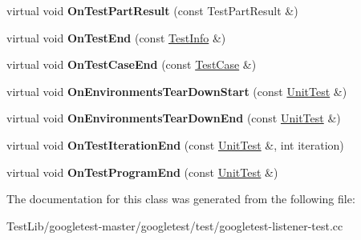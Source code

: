 \begin{DoxyCompactItemize}
virtual void {\bfseries On\+Test\+Part\+Result} (const Test\+Part\+Result \&)
\item 
\mbox{\label{classtesting_1_1internal_1_1EventRecordingListener_adb076f145cc20d9b27441b9c75da4b81}} 
virtual void {\bfseries On\+Test\+End} (const \hyperlink{classtesting_1_1TestInfo}{Test\+Info} \&)
\item 
\mbox{\label{classtesting_1_1internal_1_1EventRecordingListener_a4d0cb8a389c7339bce0aa6128291529f}} 
virtual void {\bfseries On\+Test\+Case\+End} (const \hyperlink{classtesting_1_1TestCase}{Test\+Case} \&)
\item 
\mbox{\label{classtesting_1_1internal_1_1EventRecordingListener_a17eebd7bb5cc6bab53b20794919ca5ae}} 
virtual void {\bfseries On\+Environments\+Tear\+Down\+Start} (const \hyperlink{classtesting_1_1UnitTest}{Unit\+Test} \&)
\item 
\mbox{\label{classtesting_1_1internal_1_1EventRecordingListener_acd5a3dc070265166a7da68222031fd61}} 
virtual void {\bfseries On\+Environments\+Tear\+Down\+End} (const \hyperlink{classtesting_1_1UnitTest}{Unit\+Test} \&)
\item 
\mbox{\label{classtesting_1_1internal_1_1EventRecordingListener_ab0cc007bcfaf06cd383d574c88f62aea}} 
virtual void {\bfseries On\+Test\+Iteration\+End} (const \hyperlink{classtesting_1_1UnitTest}{Unit\+Test} \&, int iteration)
\item 
\mbox{\label{classtesting_1_1internal_1_1EventRecordingListener_a21fe9c3c519c4599a48b16ddfb734aa3}} 
virtual void {\bfseries On\+Test\+Program\+End} (const \hyperlink{classtesting_1_1UnitTest}{Unit\+Test} \&)
\end{DoxyCompactItemize}


The documentation for this class was generated from the following file\+:\begin{DoxyCompactItemize}
\item 
Test\+Lib/googletest-\/master/googletest/test/googletest-\/listener-\/test.\+cc\end{DoxyCompactItemize}
